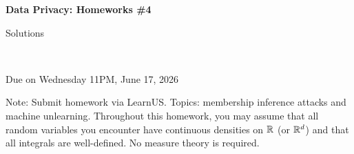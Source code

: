 \documentclass[12pt]{article}
\begin{document}
\begin{center}
{\bf Data Privacy: Homeworks \#4 \begin{solution}Solutions\end{solution}}\\ \medskip
\begin{problem}Due on Wednesday 11PM, June 17, 2026 \end{problem}
\end{center}

\begin{problem}
\noindent
Note: Submit homework via LearnUS. Topics: membership inference attacks and machine unlearning. Throughout this homework, you may assume that all random variables you encounter have continuous densities on $\mathbb{R}$ (or $\mathbb{R}^d$) and that all integrals are well-defined. No measure theory is required.
\end{problem}

\begin{solution}
\end{solution}
\end{document}
